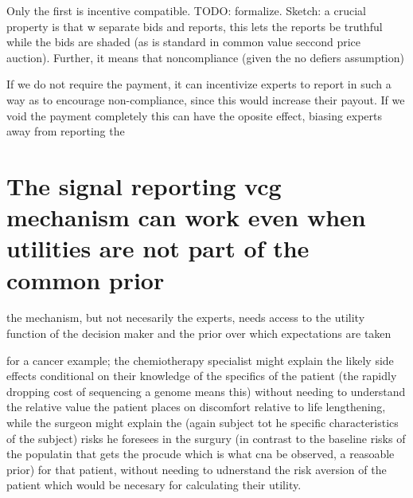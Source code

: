 \begin{thm}
Only the first is incentive compatible. TODO: formalize. Sketch: a crucial property is that w separate bids and reports, this lets the reports be truthful while the bids are shaded (as is standard in common value seccond price auction). Further, it means that noncompliance (given the no defiers assumption) 


If we do not require the payment, it can incentivize experts to report in such a way as to encourage non-compliance, since this would increase their payout. 
If we void the payment completely this can have the oposite effect, biasing experts away from reporting the 




\section{The signal reporting vcg mechanism can work even when utilities are not part of the common prior}

the mechanism, but not necesarily the experts, needs access to the utility function of the decision maker and the prior over which expectations are taken 


for a cancer example; the chemiotherapy specialist might explain the likely side effects conditional on their knowledge of the specifics of the patient (the rapidly dropping cost of sequencing a genome means this) without needing to understand the relative value the patient places on discomfort relative to life lengthening, while the surgeon might explain the (again subject tot he specific characteristics of the subject) risks he foresees in the surgury (in contrast to the baseline risks of the populatin that gets the procude which is what cna be observed, a reasoable prior) for that patient, without needing to udnerstand the risk aversion of the patient which would be necesary for calculating their utility.


\end{thm}
